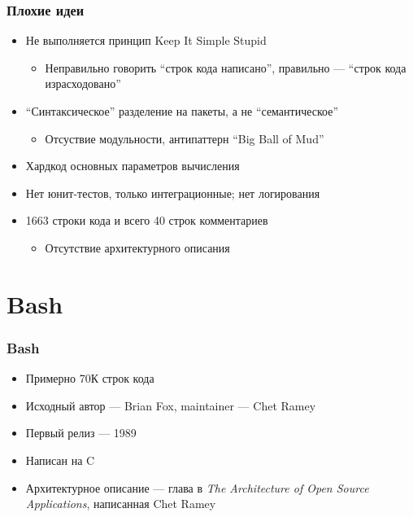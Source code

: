 \documentclass[xetex,mathserif,serif]{beamer}
\begin{document}
	\begin{frame}
		\frametitle{Плохие идеи}
		\begin{itemize}
			\item Не выполняется принцип Keep It Simple Stupid
			\begin{itemize}
				\item Неправильно говорить ``строк кода написано'', правильно --- ``строк кода израсходовано''
			\end{itemize}
			\item ``Синтаксическое'' разделение на пакеты, а не ``семантическое''
			\begin{itemize}
				\item Отсуствие модульности, антипаттерн ``Big Ball of Mud''
			\end{itemize}
			\item Хардкод основных параметров вычисления
			\item Нет юнит-тестов, только интеграционные; нет логирования
			\item 1663 строки кода и всего 40 строк комментариев
			\begin{itemize}
				\item Отсутствие архитектурного описания
			\end{itemize}
		\end{itemize}
	\end{frame}

	\section{Bash}

	\begin{frame}
		\frametitle{Bash}
		\begin{itemize}
			\item Примерно 70К строк кода
			\item Исходный автор --- Brian Fox, maintainer --- Chet Ramey
			\item Первый релиз --- 1989
			\item Написан на C
			\item Архитектурное описание --- глава в \textit{The Architecture of Open Source Applications}, написанная Chet Ramey
		\end{itemize}
	\end{frame}
\end{document}
